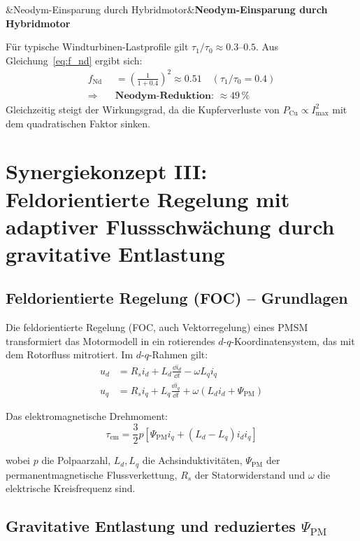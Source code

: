 ﻿\documentclass[12pt, a4paper]{report}
\newenvironment{ergebnis}[1][]{%
  \begin{ergebnisframe}\sloppy%
  \ifx&#1&\else\textbf{#1}\par\smallskip\fi}{\end{ergebnisframe}}
\theoremstyle{definition}
\theoremstyle{remark}
\begin{document}
\begin{ergebnis}[Neodym-Einsparung durch Hybridmotor]
  Für typische Windturbinen-Lastprofile gilt $\tau_1/\tau_0 \approx 0.3$--$0.5$.
  Aus Gleichung~\eqref{eq:f_nd} ergibt sich:
  \begin{align}
    f_{\text{Nd}} &= \left(\frac{1}{1+0.4}\right)^2 \approx 0.51 \quad (\tau_1/\tau_0 = 0.4) \\
    \Rightarrow \quad &\textbf{Neodym-Reduktion: } \approx 49\,\%
  \end{align}
  Gleichzeitig steigt der Wirkungsgrad, da die Kupferverluste von
  $P_{\text{Cu}} \propto I_{\max}^2$ mit dem quadratischen Faktor sinken.
\end{ergebnis}

\section{Synergiekonzept III: Feldorientierte Regelung mit adaptiver
            Flussschwächung durch gravitative Entlastung}
\label{ssec:synergie3}

\subsection{Feldorientierte Regelung (FOC) -- Grundlagen}

Die feldorientierte Regelung (FOC, auch Vektorregelung) eines PMSM transformiert
das Motormodell in ein rotierendes $d$-$q$-Koordinatensystem, das mit dem
Rotorfluss mitrotiert. Im $d$-$q$-Rahmen gilt:
\begin{align}
  u_d &= R_s i_d + L_d \frac{\dd i_d}{\dd t} - \omega L_q i_q
  \label{eq:ud} \\
  u_q &= R_s i_q + L_q \frac{\dd i_q}{\dd t} + \omega (L_d i_d + \Psi_{\text{PM}})
  \label{eq:uq}
\end{align}

Das elektromagnetische Drehmoment:
\begin{equation}
  \tau_{\text{em}} = \frac{3}{2} p \left[\Psi_{\text{PM}} i_q
                  + (L_d - L_q) i_d i_q\right]
  \label{eq:tau_em_dq}
\end{equation}

wobei $p$ die Polpaarzahl, $L_d, L_q$ die Achsinduktivitäten, $\Psi_{\text{PM}}$
der permanentmagnetische Flussverkettung, $R_s$ der Statorwiderstand und
$\omega$ die elektrische Kreisfrequenz sind.

\subsection{\texorpdfstring{Gravitative Entlastung und reduziertes $\Psi_{\text{PM}}$}{Gravitative Entlastung und reduziertes Psi\_PM}}
\end{document}
